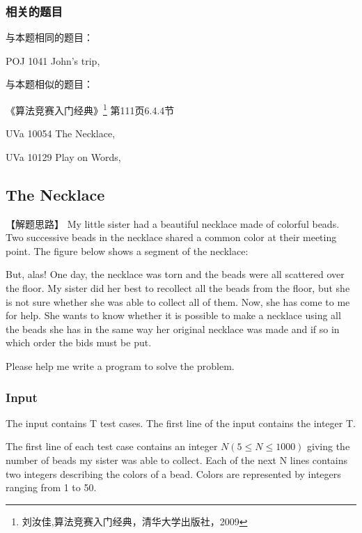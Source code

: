 \subsubsection{相关的题目}
与本题相同的题目：
\begindot
\item POJ 1041 John's trip, 
\myenddot

与本题相似的题目：
\begindot
\item 《算法竞赛入门经典》\footnote{刘汝佳,算法竞赛入门经典，清华大学出版社，2009} 第111页6.4.4节
\item  UVa 10054 The Necklace, 
\item  UVa 10129 Play on Words, 
\myenddot


\subsection{The Necklace}

【解题思路】
My little sister had a beautiful necklace made of colorful beads. Two successive beads in the
necklace shared a common color at their meeting point. The figure below shows a segment of
the necklace:

\centerline{}

But, alas! One day, the necklace was torn and the beads were all scattered over the floor.
My sister did her best to recollect all the beads from the floor, but she is not sure
whether she was able to collect all of them. Now, she has come to me for help. She wants
 to know whether it is possible to make a necklace using all the beads she has in the same
 way her original necklace was made and if so in which order the bids must be put.

Please help me write a program to solve the problem.

\subsubsection{Input}
The input contains T test cases. The first line of the input contains the integer T.

The first line of each test case contains an integer $N(5 \leq N \leq 1000)$ giving the number of beads
my sister was able to collect. Each of the next N lines contains two integers describing
the colors of a bead. Colors are represented by integers ranging from 1 to 50.


